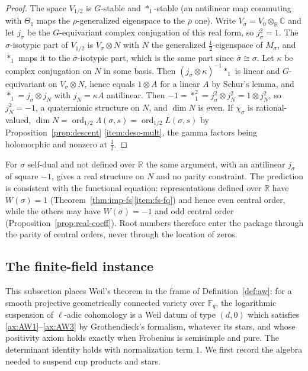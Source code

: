 \documentclass[11pt]{amsart}
\theoremstyle{plain}
\theoremstyle{definition}
\theoremstyle{remark}
\numberwithin{equation}{section}
\newcommand{\C}{\mathbb{C}}
\newcommand{\R}{\mathbb{R}}
\newcommand{\F}{\mathbb{F}}
\DeclareMathOperator{\ord}{ord}
\begin{document}
\begin{proof}
The space $V_{1/2}$ is $G$-stable and $*_1$-stable (an antilinear map
commuting with $\Theta_1$ maps the $\rho$-generalized eigenspace to the
$\bar\rho$ one). Write $V_\sigma=V_0\otimes_\R\C$ and let $j_\sigma$ be
the $G$-equivariant complex conjugation of this real form, so
$j_\sigma^2=1$. The $\sigma$-isotypic part of $V_{1/2}$ is
$V_\sigma\otimes N$ with $N$ the generalized $\tfrac12$-eigenspace of
$M_\sigma$, and $*_1$ maps it to the $\bar\sigma$-isotypic part, which
is the same part since $\bar\sigma\cong\sigma$. Let $\kappa$ be complex
conjugation on $N$ in some basis. Then $(j_\sigma\otimes\kappa)^{-1}*_1$
is linear and $G$-equivariant on $V_\sigma\otimes N$, hence equals
$1\otimes A$ for a linear $A$ by Schur's lemma, and
$*_1=j_\sigma\otimes j_N$ with $j_N=\kappa A$ antilinear. Then
$-1=*_1^2=j_\sigma^2\otimes j_N^2=1\otimes j_N^2$, so $j_N^2=-1$, a
quaternionic structure on $N$, and $\dim N$ is even. If $\chi_\sigma$
is rational-valued, $\dim N=\ord_{1/2}\Lambda(\sigma,s)=
\ord_{1/2}L(\sigma,s)$ by Proposition~\ref{prop:descent}%
\ref{item:desc-mult}, the gamma factors being holomorphic and nonzero
at $\tfrac12$.
\end{proof}

For $\sigma$ self-dual and not defined over $\R$ the same argument,
with an antilinear $j_\sigma$ of square $-1$, gives a real structure on
$N$ and no parity constraint. The prediction is consistent with the
functional equation: representations defined over $\R$ have
$W(\sigma)=1$ (Theorem~\ref{thm:imp-fs}\ref{item:fs-fq}) and hence even
central order, while the others may have $W(\sigma)=-1$ and odd central
order (Proposition~\ref{prop:real-coeff}). Root numbers therefore enter
the package through the parity of central orders, never through the
location of zeros.
\subsection{The finite-field instance}\label{subsec:thmB}

This subsection places Weil's theorem in the frame of
Definition~\ref{def:aw}: for a smooth projective geometrically connected
variety over $\F_q$, the logarithmic suspension of $\ell$-adic
cohomology is a Weil datum of type $(d,0)$ which satisfies
\ref{ax:AW1}--\ref{ax:AW3} by Grothendieck's formalism, whatever its
stars, and whose positivity axiom holds exactly when Frobenius is
semisimple and pure. The determinant identity holds with normalization
term $1$. We first record the algebra needed to suspend cup products
and stars.
\end{document}
